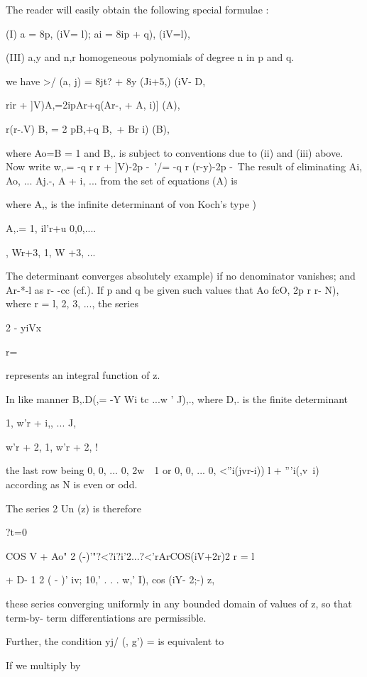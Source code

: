 {{%
%

The reader will easily obtain the following special formulae :

(I) a = 8p, (iV= l); ai = 8ip + q), (iV=l),

(III) a,y and n,r homogeneous polynomials of degree n in p and q.

we have >/ (a, j) = 8jt? + 8y (Ji+5,) (iV- D,

rir + ]V)A,=2ipAr+q(Ar-, + A, i)] (A),

r(r-.V) B, = 2 pB,+q B,\, + Br i) (B),

where Ao=B = 1 and B,. is subject to conventions due to (ii) and (iii)
above. Now write w,.= -q r r + ]V)-2p -\ '/= -q r (r-y)-2p -\ The
result of eliminating Ai, Ao, ... Aj.-, A + i, ... from the set of
equations (A) is

where A,, is the infinite determinant of von Koch's type )

A,.= 1, il'r+u 0,0,....

, Wr+3, 1, W +3, ...

The determinant converges absolutely  example) if no
denominator vanishes; and Ar-*-l as r- -cc (cf.). If p and q
be given such values that Ao fcO, 2p r r- N), where r = l, 2, 3, ...,
the series

2 - yiVx%

r=\

represents an integral function of z.

In like manner B,.D(,= -Y Wi tc ...w ' J),., where D,. is the finite
determinant

1, w'r + i,, ... J,

w'r + 2, 1, w'r + 2,  !

the last row being 0, 0, ... 0, 2w\ \, 1 or 0, 0, ... 0, <''i(jvr-i))
l + '''i(,v\ i) according as N is even or odd.

The series 2 Un (z) is therefore

?t=0

COS V + Ao" 2 (-)'"?<?i?i'2...?<'rArCOS(iV+2r)2 r = l

+ D- 1 2 ( - )' iv; 10,' . . . w,' I), cos (iY- 2;-) z,

these series converging uniformly in any bounded domain of values of
z, so that term-by- term differentiations are permissible.

Further, the condition yj/ (, g') = is equivalent to

If we multiply by

}}
